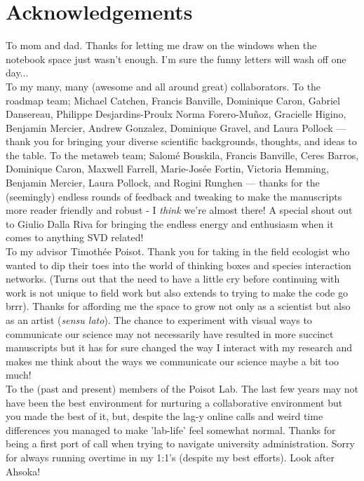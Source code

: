 \documentclass[12pt,twoside,phd]{dms}
\numberwithin{equation}{section}
\numberwithin{table}{chapter}
\numberwithin{figure}{chapter}
\begin{document}
\chapter*{Acknowledgements}

To mom and dad. Thanks for letting me draw on the windows when the notebook space just wasn't enough. I'm sure the funny letters will wash off one day...\\

To my many, many (awesome and all around great) collaborators. To the roadmap team; Michael Catchen, Francis Banville, Dominique Caron, Gabriel Dansereau, Philippe Desjardins-Proulx Norma Forero-Muñoz, Gracielle Higino, Benjamin Mercier, Andrew Gonzalez, Dominique Gravel, and Laura Pollock --- thank you for bringing your diverse scientific backgrounds, thoughts, and ideas to the table. To the metaweb team; Salomé Bouskila, Francis Banville, Ceres Barros, Dominique Caron, Maxwell Farrell, Marie-Josée Fortin, Victoria Hemming, Benjamin Mercier, Laura Pollock, and Rogini Runghen --- thanks for the (seemingly) endless rounds of feedback and tweaking to make the manuscripts more reader friendly and robust - I \emph{think} we're almost there! A special shout out to Giulio Dalla Riva for bringing the endless energy and enthusiasm when it comes to anything SVD related!\\

To my advisor Timothée Poisot. Thank you for taking in the field ecologist who wanted to dip their toes into the world of thinking boxes and species interaction networks. (Turns out that the need to have a little cry before continuing with work is not unique to field work but also extends to trying to make the code go brrr). Thanks for affording me the space to grow not only as a scientist but also as an artist (\emph{sensu lato}). The chance to experiment with visual ways to communicate our science may not necessarily have resulted in more succinct manuscripts but it has for sure changed the way I interact with my research and makes me think about the ways we communicate our science maybe a bit too much!\\

To the (past and present) members of the Poisot Lab. The last few years may not have been the best environment for nurturing a collaborative environment but you made the best of it, but, despite the lag-y online calls and weird time differences you managed to make 'lab-life' feel somewhat normal. Thanks for being a first port of call when trying to navigate university administration. Sorry for  always running overtime in my 1:1's (despite my best efforts). Look after Ahsoka!\\
\end{document}

